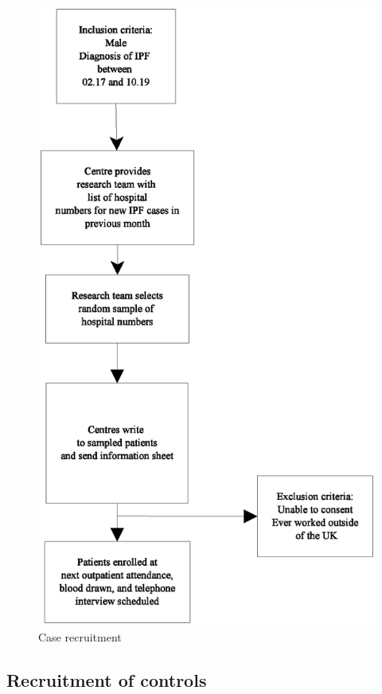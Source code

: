 \documentclass[a4paper,10pt]{article}
\begin{document}
\begin{figure}
\includegraphics[scale=0.8]{fig/case-recruitment.eps}
\caption{Case recruitment\label{fig:caserec}}
\end{figure}
\subsection{Recruitment of controls}
\end{document}
